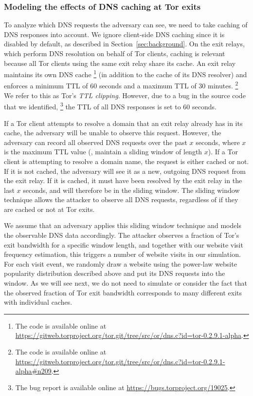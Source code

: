 \subsubsection{Modeling the effects of DNS caching at Tor exits}
To analyze which DNS requests the adversary can see, we need to
take caching of DNS responses into account. We ignore client-side DNS
caching since it is disabled by default, as described in
Section~\ref{sec:background}.
On the exit relays, which perform DNS resolution on behalf of Tor clients,
caching is relevant because all Tor clients using the same exit relay share its
cache.  An exit relay maintains its own DNS cache%
\footnote{The code is available online at \url{https://gitweb.torproject.org/tor.git/tree/src/or/dns.c?id=tor-0.2.9.1-alpha}.}
(in addition to the cache of its DNS resolver) and enforces a minimum TTL of 60
seconds and a maximum TTL of 30 minutes.%
\footnote{The code is available online at \url{https://gitweb.torproject.org/tor.git/tree/src/or/dns.c?id=tor-0.2.9.1-alpha\#n209}.}
We refer to this as Tor's \emph{TTL clipping}. However, due to a bug in the
source code that we identified,%
\footnote{The bug report is available online at \url{https://bugs.torproject.org/19025}.}
the TTL of all DNS responses is set to 60 seconds.

If a Tor client attempts to resolve a domain that an exit relay already has in
its cache, the adversary will be unable to observe this request.  However, the
adversary can record all observed DNS requests over the past $x$
seconds, where $x$ is the maximum TTL value (\ie, maintain a sliding window of
length $x$).  If a Tor client
is attempting to resolve a domain name, the request is either cached or not.  If
it is not cached, the adversary will see it as a new, outgoing DNS request from
the exit relay. If it is cached, it must have been resolved by the exit relay in
the last $x$ seconds, and will therefore be in the sliding window.  The sliding
window technique allows the attacker to observe all DNS requests, regardless of
if they are cached or not at Tor exits.

We assume that an adversary applies this sliding window technique and models the
observable DNS data accordingly.  The attacker observes a fraction of Tor's exit
bandwidth for a specific window length, and together with our website visit
frequency estimation, this triggers a number of website visits in our
simulation.  For each visit event, we randomly draw a website using the
power-law website popularity distribution described above and put its DNS
requests into the window. As we will see next, we do not need to simulate or
consider the fact that the observed fraction of Tor exit bandwidth corresponds
to many different exits with individual caches.

